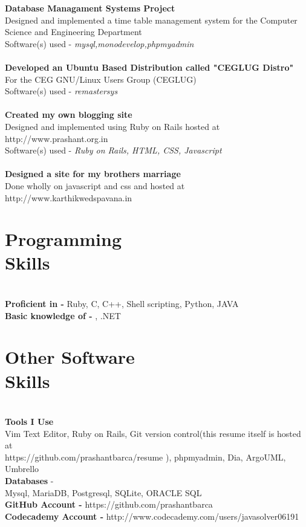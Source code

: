 \documentclass[margin,line]{resume}
\begin{document}
\begin{resume}
    \textbf{Database Managament Systems Project} \\Designed and implemented a time table management system for the Computer Science and Engineering Department \vspace{2mm}\\\vspace{1mm}%
    Software(s) used -  \textsl{mysql,monodevelop,phpmyadmin}\\
    \\\textbf{Developed an Ubuntu Based Distribution called "CEGLUG Distro"} \\For the CEG GNU/Linux Users Group (CEGLUG) \vspace{2mm}\\\vspace{1mm}%
    Software(s) used -  \textsl{remastersys}\\
    \\\textbf{Created my own blogging site} \\Designed and implemented using Ruby on Rails hosted at http://www.prashant.org.in \vspace{2mm}\\\vspace{1mm}%
    Software(s) used -  \textsl{Ruby on Rails, HTML, CSS, Javascript}\\
    \\\textbf{Designed a site for my brothers marriage} \\Done wholly on javascript and css and hosted at http://www.karthikwedspavana.in  \vspace{2mm}\\\vspace{1mm}%

    \section{\mysidestyle Programming\\Skills}\\ 
    \textbf{Proficient in -}  Ruby, C, C++, Shell scripting, Python, JAVA
\\\textbf{Basic knowledge of -}  \LaTeXe, .NET 

    \section{\mysidestyle Other Software\\Skills} \\
    \textbf{Tools I Use}  \\Vim Text Editor, Ruby on Rails, Git version control(this resume itself is hosted at \\https://github.com/prashantbarca/resume ), phpmyadmin, Dia, ArgoUML, Umbrello
    \\\textbf{Databases} - \\Mysql, MariaDB, Postgresql, SQLite, ORACLE SQL
    \\\textbf{GitHub Account -}  https://github.com/prashantbarca
    \\\textbf{Codecademy Account -}  http://www.codecademy.com/users/javasolver06191

\end{resume}
\end{document}
